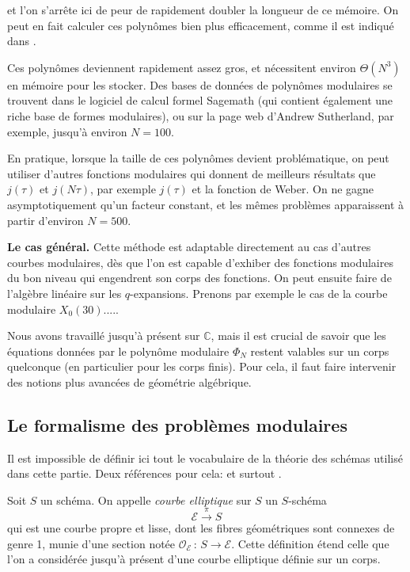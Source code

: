 \documentclass[11pt,a4paper]{article}
\newcommand{\C}{\mathbb{C}}
\newcommand{\E}{\mathcal{E}}
\renewcommand{\O}{\mathcal{O}}
\newcommand{\vers}{\longrightarrow}
\newcommand{\de}{\,:\,}
\renewcommand{\v}{\vspace{5mm}}
\theoremstyle{definition}
\begin{document}
et l'on s'arrête ici de peur de rapidement doubler la longueur de ce mémoire. On peut en fait calculer ces polynômes bien plus efficacement, comme il est indiqué dans \cite{Elkies}.

Ces polynômes deviennent rapidement assez gros, et nécessitent environ $\Theta(N^3)$ en mémoire pour les stocker.
Des bases de données de polynômes modulaires se trouvent dans le logiciel de calcul formel Sagemath \cite{Sage} (qui contient également une riche base de formes modulaires), ou sur la page web d'Andrew Sutherland, par exemple, jusqu'à environ $N = 100$.

En pratique, lorsque la taille de ces polynômes devient problématique, on peut utiliser d'autres fonctions modulaires qui donnent de meilleurs résultats que $j(\tau)$ et $j(N\tau)$, par exemple $j(\tau)$ et la fonction de Weber. On ne gagne asymptotiquement qu'un facteur constant, et les mêmes problèmes apparaissent à partir d'environ $N=500$.
\v

\textbf{Le cas général.} Cette méthode est adaptable directement au cas d'autres courbes modulaires, dès que l'on est capable d'exhiber des fonctions modulaires du bon niveau qui engendrent son corps des fonctions. On peut ensuite faire de l'algèbre linéaire sur les $q$-expansions. Prenons par exemple le cas de la courbe modulaire $X_0(30)$.....
\v

Nous avons travaillé jusqu'à présent sur $\C$, mais il est crucial de savoir que les équations données par le polynôme modulaire $\Phi_N$ restent valables sur un corps quelconque (en particulier pour les corps finis). Pour cela, il faut faire intervenir des notions plus avancées de géométrie algébrique.


\subsection{Le formalisme des problèmes modulaires}


Il est impossible de définir ici tout le vocabulaire de la théorie des schémas utilisé dans cette partie. Deux références pour cela: \cite{Hart} et surtout \cite{Stack}.


Soit $S$ un schéma. On appelle \emph{courbe elliptique} sur $S$ un $S$-schéma
$$\E \overset{\pi}{\vers} S$$
qui est une courbe propre et lisse, dont les fibres géométriques sont connexes de genre 1, munie d'une section notée $\O_\E\de S\vers \E$. Cette définition étend celle que l'on a considérée jusqu'à présent d'une courbe elliptique définie sur un corps.
\end{document}

